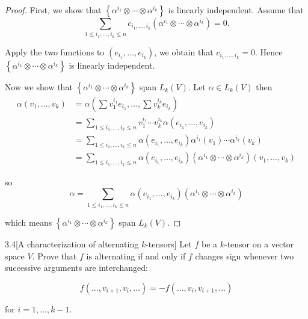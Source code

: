 \begin{proof}
    First, we show that \( \left\{ \alpha^{i_{1}} \otimes \cdots \otimes \alpha^{i_{k}} \right\} \) is linearly independent. Assume that
    \[
        \sum_{1\leq i_{1}, \ldots, i_{k} \leq n} c_{i_{1},\ldots, i_{k}}(\alpha^{i_{1}} \otimes \cdots \otimes \alpha^{i_{k}}) = 0.
    \]

    Apply the two functions to \( (e_{i_{1}}, \ldots, e_{i_{k}}) \), we obtain that \( c_{i_{1}, \ldots, i_{k}} = 0 \). Hence \( \left\{ \alpha^{i_{1}} \otimes \cdots \otimes \alpha^{i_{k}} \right\} \) is linearly independent.

    Now we show that  \( \left\{ \alpha^{i_{1}} \otimes \cdots \otimes \alpha^{i_{k}} \right\} \) span \( L_{k}(V) \). Let \( \alpha \in L_{k}(V) \) then
    \begingroup
    \allowdisplaybreaks%
    \begin{align*}
        \alpha(v_{1}, \ldots, v_{k}) & = \alpha\left(\sum v_{1}^{i_{1}}e_{i_{1}}, \ldots, \sum v_{k}^{i_{k}} e_{i_{k}}\right)                                                                       \\
                                     & = \sum_{1\leq i_{1}, \ldots, i_{k} \leq n} v_{1}^{i_{1}}\cdots v_{k}^{i_{k}} \alpha(e_{i_{1}}, \ldots, e_{i_{k}})                                            \\
                                     & = \sum_{1\leq i_{1}, \ldots, i_{k} \leq n} \alpha(e_{i_{1}}, \ldots, e_{i_{k}}) \alpha^{i_{1}}(v_{1})\cdots \alpha^{i_{k}}(v_{k})                            \\
                                     & = \sum_{1\leq i_{1}, \ldots, i_{k} \leq n} \alpha(e_{i_{1}}, \ldots, e_{i_{k}}) (\alpha^{i_{1}} \otimes \cdots \otimes \alpha^{i_{k}})(v_{1}, \ldots, v_{k})
    \end{align*}
    \endgroup

    so
    \[
        \alpha = \sum_{1\leq i_{1}, \ldots, i_{k} \leq n} \alpha(e_{i_{1}}, \ldots, e_{i_{k}}) (\alpha^{i_{1}} \otimes \cdots \otimes \alpha^{i_{k}})
    \]

    which means \( \left\{ \alpha^{i_{1}} \otimes \cdots \otimes \alpha^{i_{k}} \right\} \) span \( L_{k}(V) \).
\end{proof}

\begin{problem}{3.4}[A characterization of alternating \( k \)-tensors]
Let \( f \) be a \( k \)-tensor on a vector space \( V \). Prove that \( f \) is alternating if and only if \( f \) changes sign whenever two successive arguments are interchanged:

\[
    f(\ldots, v_{i+1}, v_{i}, \ldots) = -f(\ldots, v_{i}, v_{i+1}, \ldots)
\]

for \( i = 1, \ldots, k-1 \).
\end{problem}

